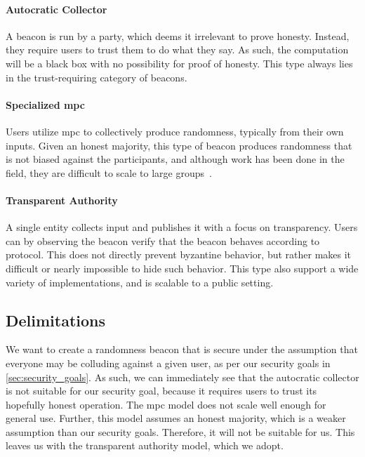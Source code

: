\paragraph{Autocratic Collector} A beacon is run by a party, which deems it irrelevant to prove honesty. Instead, they require users to trust them to do what they say. As such, the computation will be a black box with no possibility for proof of honesty. This type always lies in the trust-requiring category of beacons.

\paragraph{Specialized \acrshort{mpc}} Users utilize \acrfull{mpc} to collectively produce randomness, typically from their own inputs. Given an honest majority, this type of beacon produces randomness that is not biased against the participants, and although work has been done in the field, they are difficult to scale to large groups~\cite{cascudo2017scrape, syta2017scalable}.

\paragraph{Transparent Authority} A single entity collects input and publishes it with a focus on transparency. Users can by observing the beacon verify that the beacon behaves according to protocol. This does not directly prevent byzantine behavior, but rather makes it difficult or nearly impossible to hide such behavior. This type also support a wide variety of implementations, and is scalable to a public setting.

\subsection{Delimitations}%
\label{sub:delimitations}
We want to create a randomness beacon that is secure under the assumption that everyone may be colluding against a given user, as per our security goals in \cref{sec:security_goals}. As such, we can immediately see that the autocratic collector is not suitable for our security goal, because it requires users to trust its hopefully honest operation. The \gls{mpc} model does not scale well enough for general use. Further, this model assumes an honest majority, which is a weaker assumption than our security goals. Therefore, it will not be suitable for us. This leaves us with the transparent authority model, which we adopt.

